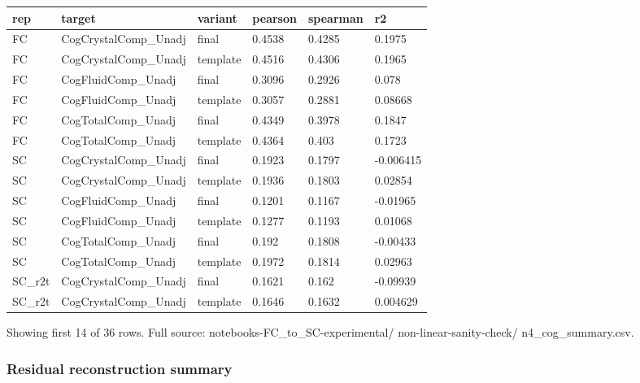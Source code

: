{\def\LTcaptype{none} %
\begin{longtable}[]{@{}llllll@{}}
\toprule\noalign{}
rep & target & variant & pearson & spearman & r2 \\
\midrule\noalign{}
\endhead
\bottomrule\noalign{}
\endlastfoot
FC & CogCrystalComp\_Unadj & final & 0.4538 & 0.4285 & 0.1975 \\
FC & CogCrystalComp\_Unadj & template & 0.4516 & 0.4306 & 0.1965 \\
FC & CogFluidComp\_Unadj & final & 0.3096 & 0.2926 & 0.078 \\
FC & CogFluidComp\_Unadj & template & 0.3057 & 0.2881 & 0.08668 \\
FC & CogTotalComp\_Unadj & final & 0.4349 & 0.3978 & 0.1847 \\
FC & CogTotalComp\_Unadj & template & 0.4364 & 0.403 & 0.1723 \\
SC & CogCrystalComp\_Unadj & final & 0.1923 & 0.1797 & -0.006415 \\
SC & CogCrystalComp\_Unadj & template & 0.1936 & 0.1803 & 0.02854 \\
SC & CogFluidComp\_Unadj & final & 0.1201 & 0.1167 & -0.01965 \\
SC & CogFluidComp\_Unadj & template & 0.1277 & 0.1193 & 0.01068 \\
SC & CogTotalComp\_Unadj & final & 0.192 & 0.1808 & -0.00433 \\
SC & CogTotalComp\_Unadj & template & 0.1972 & 0.1814 & 0.02963 \\
SC\_r2t & CogCrystalComp\_Unadj & final & 0.1621 & 0.162 & -0.09939 \\
SC\_r2t & CogCrystalComp\_Unadj & template & 0.1646 & 0.1632 & 0.004629 \\
\end{longtable}
}

Showing first 14 of 36 rows. Full source: notebooks-FC\_to\_SC-experimental/ non-linear-sanity-check/ n4\_cog\_summary.csv.

\subsubsection{Residual reconstruction summary}\label{residual-reconstruction-summary}


